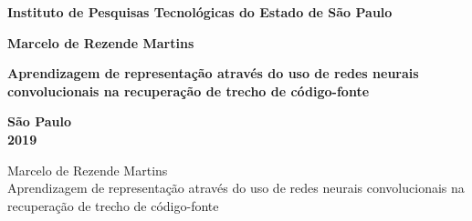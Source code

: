 \documentclass[12pt,twoside,a4paper]{book} %
\begin{document}
\frontmatter 
\fancyhead[RO]{{\footnotesize\rightmark}\hspace{2em}\thepage}
\setcounter{tocdepth}{2}
\fancyhead[LE]{\thepage\hspace{2em}\footnotesize{\leftmark}}
\fancyhead[RE,LO]{}
\fancyhead[RO]{{\footnotesize\rightmark}\hspace{2em}\thepage}

\onehalfspacing  %

\thispagestyle{empty}
\begin{center}
    \large{\textbf{Instituto de Pesquisas Tecnológicas do Estado de São Paulo}}\\
    
    \vspace*{4cm}
    
    
    
    
    \large{\textbf{Marcelo de Rezende Martins}}
    
    \vspace*{6cm}
    
    \textbf{\large{Aprendizagem de representação através do uso de redes neurais convolucionais na recuperação de trecho de código-fonte}}\\
    
    
    
   \vspace*{10cm}
   
    \large{\textbf{São Paulo}} \\
    \large{\textbf{2019}}
\end{center}

%
%
%
\newpage
\thispagestyle{empty}
    \begin{center}
        Marcelo de Rezende Martins\\
        \vspace*{2.3 cm}
        Aprendizagem de representação através do uso de redes neurais convolucionais na recuperação de trecho de código-fonte\\
        \vspace*{2 cm}
    \end{center}
\end{document}
